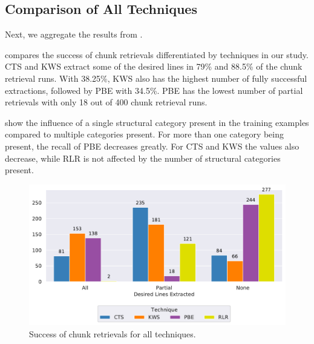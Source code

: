\subsection{Comparison of All Techniques}
Next, we aggregate the results from
.

 compares the success of chunk
retrievals differentiated by techniques in our study.
CTS and KWS
extract some of the desired lines in 79\% and 88.5\% of the chunk
retrieval runs.
With 38.25\%, KWS also has the highest number of fully
successful extractions, followed by PBE with 34.5\%.
PBE has the
lowest number of partial retrievals with only 18 out of 400 chunk
retrieval runs.


show the influence of a single structural category present in the
training examples compared to multiple categories present.
For more
than one category being present, the recall of PBE decreases greatly.
For CTS and KWS the values also decrease, while RLR is not affected by
the number of structural categories present.

\begin{figure}[!t]
		\centering
		\includegraphics[width=\columnwidth,
		clip]{img/big-study/success-partial-all.pdf}
		\caption{Success of chunk retrievals for all techniques.}
		\label{fig:success-partial-all}
\end{figure}


